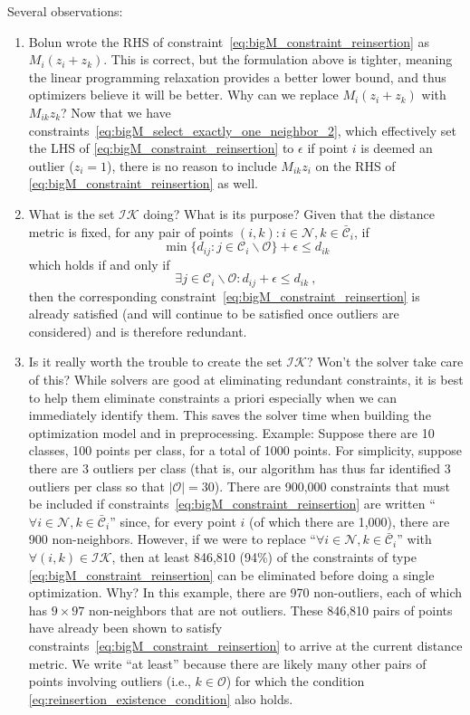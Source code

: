 \documentclass[]{article}
\newcommand{\mc}{\mathcal}
\begin{document}
Several observations:
\begin{enumerate}
\item Bolun wrote the RHS of constraint~\eqref{eq:bigM_constraint_reinsertion} as $M_i (z_i + z_k)$.  This is correct, but the formulation above is tighter, meaning the linear programming relaxation provides a better lower bound, and thus optimizers believe it will be better.  Why can we replace $M_i (z_i + z_k)$ with $M_{ik} z_k$?  Now that we have constraints~\eqref{eq:bigM_select_exactly_one_neighbor_2}, which effectively set the LHS of \eqref{eq:bigM_constraint_reinsertion} to $\epsilon$ if point $i$ is deemed an outlier ($z_i=1$), there is no reason to include $M_{ik} z_i$ on the RHS of \eqref{eq:bigM_constraint_reinsertion} as well. 
\item What is the set $\mc{IK}$ doing?  What is its purpose?  Given that the distance metric is fixed,
for any pair of points $(i,k): i \in \mc{N}, k \in \bar{\mc{C}}_i$, if 
$$
\min\{ d_{ij} : j \in \mc{C}_i \backslash \mc{O} \} + \epsilon \leq d_{ik}
$$
which holds if and only if 
\begin{equation} \label{eq:reinsertion_existence_condition}
\exists j \in \mc{C}_i \backslash \mc{O} : d_{ij} + \epsilon \leq d_{ik}~,
\end{equation}
then the corresponding constraint~\eqref{eq:bigM_constraint_reinsertion} is already satisfied (and will continue to be satisfied once outliers are considered) and is therefore redundant.
\item Is it really worth the trouble to create the set $\mc{IK}$? Won't the solver take care of this?
While solvers are good at eliminating redundant constraints,
it is best to help them eliminate constraints a priori especially when we can immediately identify them.
This saves the solver time when building the optimization model and in preprocessing. 
Example: Suppose there are 10 classes, 100 points per class, for a total of 1000 points.
For simplicity, suppose there are 3 outliers per class (that is, our algorithm has thus far identified 3 outliers per class so that $|\mc{O}|=30$).
There are 900,000 constraints that must be included if constraints~\eqref{eq:bigM_constraint_reinsertion} are written ``$\forall i \in \mc{N}, k \in \bar{\mc{C}}_i$'' since, for every point $i$ (of which there are 1,000), there are 900 non-neighbors.  However, if we were to replace ``$\forall i \in \mc{N}, k \in \bar{\mc{C}}_i$'' with $\forall (i,k) \in \mc{IK}$, then at least 846,810 (94\%) of the constraints of type \eqref{eq:bigM_constraint_reinsertion} can be eliminated before doing a single optimization. Why? In this example, there are 970 non-outliers, each of which has $9 \times 97$ non-neighbors that are not outliers.  These 846,810 pairs of points have already been shown to satisfy constraints~\eqref{eq:bigM_constraint_reinsertion} to arrive at the current distance metric.  We write ``at least'' because there are likely many other pairs of points involving outliers (i.e., $k \in \mc{O}$) for which the condition \eqref{eq:reinsertion_existence_condition} also holds.  
\end{enumerate}
\end{document}
